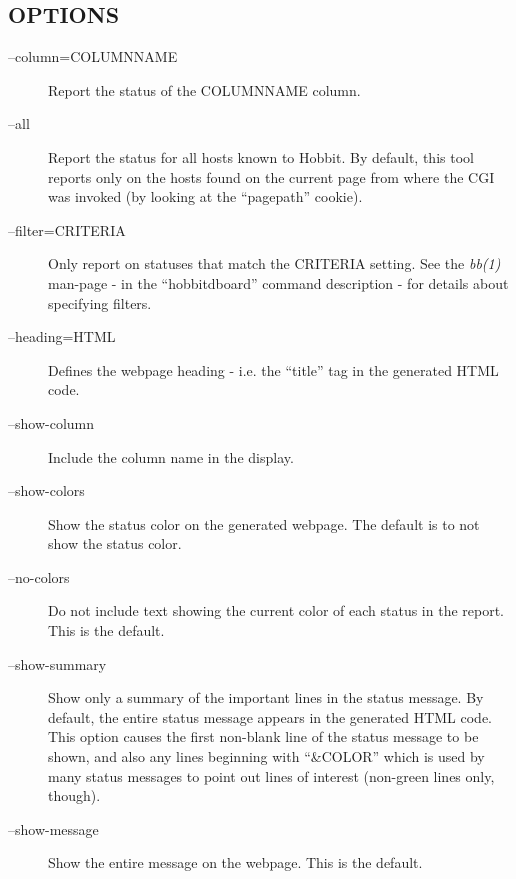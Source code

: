  
\subsection{OPTIONS}
\begin{description}
\item[--column=COLUMNNAME] Report the status of the COLUMNNAME column. 

 

\item[--all] Report the status for all hosts known to Hobbit. By
  default, this tool reports only on the hosts found on the current
  page from where the CGI was invoked (by looking at the ``pagepath''
  cookie). 


 

\item[--filter=CRITERIA] Only report on statuses that match the
  CRITERIA setting. See the \emph{bb(1)} man-page - in the
  ``hobbitdboard'' command description - for details about specifying
  filters. 


 

\item[--heading=HTML] Defines the webpage heading - i.e. the ``title'' tag in the generated HTML code. 

 

\item[--show-column] Include the column name in the display. 

 

\item[--show-colors] Show the status color on the generated webpage. The default is to not show the status color. 

 

\item[--no-colors] Do not include text showing the current color of each status in the report. This is the default. 

 

\item[--show-summary] Show only a summary of the important lines in
  the status message. By default, the entire status message appears in
  the generated HTML code. This option causes the first non-blank line
  of the status message to be shown, and also any lines beginning with
  ``\&COLOR'' which is used by many status messages to point out lines
  of interest (non-green lines only, though). 


 

\item[--show-message] Show the entire message on the webpage. This is the default. 


\end{description}
